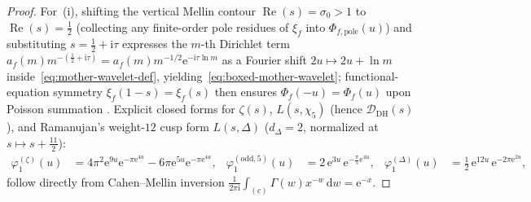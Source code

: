 \documentclass[11pt,reqno]{amsart}
\theoremstyle{definition}
\theoremstyle{remark}
\numberwithin{equation}{section}
\newcommand{\dd}{\mathrm{d}}
\newcommand{\ii}{\mathrm{i}}
\newcommand{\ee}{\mathrm{e}}
\DeclareMathOperator{\Reop}{Re}
\begin{document}
\begin{proof}
For~(i), shifting the vertical Mellin contour $\Reop(s) = \sigma_0 > 1$ to $\Reop(s) = \frac{1}{2}$ (collecting any finite-order pole residues of $\xi_f$ into $\Phi_{f,\mathrm{pole}}(u)$) and substituting $s = \frac{1}{2} + \ii\tau$ expresses the $m$-th Dirichlet term $a_f(m)m^{-(\frac{1}{2}+\ii\tau)} = a_f(m)m^{-1/2}\ee^{-\ii\tau\ln m}$ as a Fourier shift $2u \mapsto 2u + \ln m$ inside~\eqref{eq:mother-wavelet-def}, yielding~\eqref{eq:boxed-mother-wavelet}; functional-equation symmetry $\xi_f(1-s)=\xi_f(s)$ then ensures $\Phi_f(-u)=\Phi_f(u)$ upon Poisson summation \cite{hecke1936}. Explicit closed forms for $\zeta(s)$, $L(s,\chi_5)$ (hence $\mathcal{D}_{\mathrm{DH}}(s)$), and Ramanujan's weight-$12$ cusp form $L(s,\Delta)$ ($d_\Delta = 2$, normalized at $s \mapsto s + \frac{11}{2}$):
\begin{align}
  \varphi_1^{(\zeta)}(u) &= 4\pi^2 \ee^{9u}\ee^{-\pi\ee^{4u}} - 6\pi\ee^{5u}\ee^{-\pi\ee^{4u}}, &
  \varphi_1^{(\mathrm{odd},5)}(u) &= 2\,\ee^{3u}\,\ee^{-\frac{\pi}{5}\ee^{4u}}, &
  \varphi_1^{(\Delta)}(u) &= \frac{1}{2}\,\ee^{12u}\,\ee^{-2\pi\ee^{2u}},
  \label{eq:explicit-mother-wavelets}
\end{align}
follow directly from Cahen--Mellin inversion $\frac{1}{2\pi\ii}\int_{(c)}\Gamma(w)x^{-w}\,\dd w = \ee^{-x}$.


\end{proof}
\end{document}

